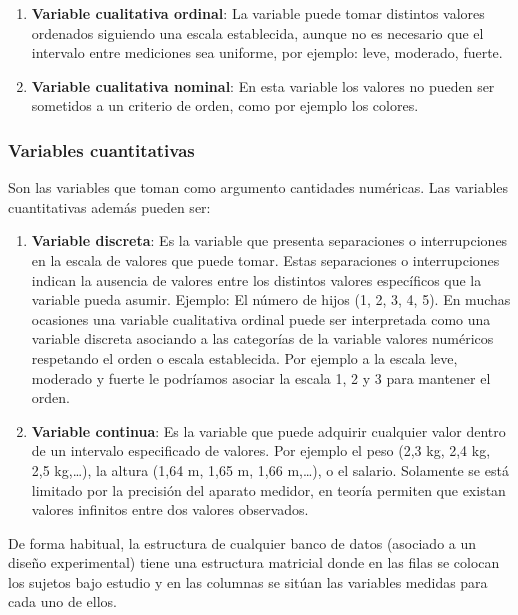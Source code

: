 \documentclass[
]{book}
\providecommand{\tightlist}{%
  \setlength{\itemsep}{0pt}\setlength{\parskip}{0pt}}
\begin{document}
\begin{enumerate}
\def\labelenumi{\roman{enumi})}
\tightlist
\item
  \textbf{Variable cualitativa ordinal}: La variable puede tomar distintos valores ordenados siguiendo una escala establecida, aunque no es necesario que el intervalo entre mediciones sea uniforme, por ejemplo: leve, moderado, fuerte.
\item
  \textbf{Variable cualitativa nominal}: En esta variable los valores no pueden ser sometidos a un criterio de orden, como por ejemplo los colores.
\end{enumerate}

\hypertarget{variables-cuantitativas}{%
\subsubsection{Variables cuantitativas}\label{variables-cuantitativas}}

Son las variables que toman como argumento cantidades numéricas. Las variables cuantitativas además pueden ser:

\begin{enumerate}
\def\labelenumi{\roman{enumi})}
\tightlist
\item
  \textbf{Variable discreta}: Es la variable que presenta separaciones o interrupciones en la escala de valores que puede tomar. Estas separaciones o interrupciones indican la ausencia de valores entre los distintos valores específicos que la variable pueda asumir. Ejemplo: El número de hijos (1, 2, 3, 4, 5). En muchas ocasiones una variable cualitativa ordinal puede ser interpretada como una variable discreta asociando a las categorías de la variable valores numéricos respetando el orden o escala establecida. Por ejemplo a la escala leve, moderado y fuerte le podríamos asociar la escala 1, 2 y 3 para mantener el orden.\\
\item
  \textbf{Variable continua}: Es la variable que puede adquirir cualquier valor dentro de un intervalo especificado de valores. Por ejemplo el peso (2,3 kg, 2,4 kg, 2,5 kg,\ldots), la altura (1,64 m, 1,65 m, 1,66 m,\ldots), o el salario. Solamente se está limitado por la precisión del aparato medidor, en teoría permiten que existan valores infinitos entre dos valores observados.
\end{enumerate}

De forma habitual, la estructura de cualquier banco de datos (asociado a un diseño experimental) tiene una estructura matricial donde en las filas se colocan los sujetos bajo estudio y en las columnas se sitúan las variables medidas para cada uno de ellos.
\end{document}
